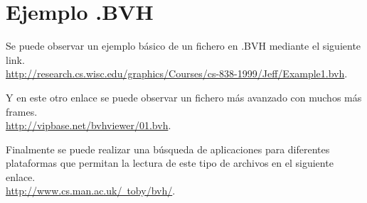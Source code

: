 \documentclass[11pt,letterpaper]{article}     %
\begin{document}
\section{Ejemplo .BVH}\label{Apendx:BHV}
Se puede observar un ejemplo b\' asico de un fichero en .BVH mediante el siguiente link.\\ \href{url}{http://research.cs.wisc.edu/graphics/Courses/cs-838-1999/Jeff/Example1.bvh}.

Y en este otro enlace se puede observar un fichero m\' as avanzado con muchos m\' as frames.\\ \href{url}{http://vipbase.net/bvhviewer/01.bvh}.

Finalmente se puede realizar una b\' usqueda de aplicaciones para diferentes plataformas que permitan la lectura de este tipo de archivos en el siguiente enlace.\\ \href{url}{http://www.cs.man.ac.uk/~toby/bvh/}.


\newpage
\renewcommand{\bibname}{Referencias}
\end{document}
